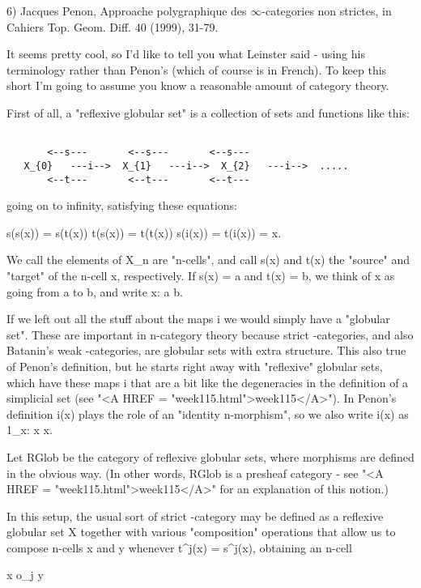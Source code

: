 6) Jacques Penon, Approache polygraphique des $\infty$-categories
non strictes, in Cahiers Top. Geom. Diff. 40 (1999), 31-79.

It seems pretty cool, so I'd like to tell you what Leinster said -
using his terminology rather than Penon's (which of course is in
French).  To keep this short I'm going to assume you know a 
reasonable amount of category theory.

First of all, a "reflexive globular set" is a collection of sets and
functions like this:


\begin{verbatim}

       <--s---       <--s---       <--s---
   X_{0}   ---i-->  X_{1}   ---i-->  X_{2}   ---i-->  .....
       <--t---       <--t---       <--t---
\end{verbatim}
    
going on to infinity, satisfying these equations:

s(s(x)) = s(t(x))
t(s(x)) = t(t(x)) 
s(i(x)) = t(i(x)) = x.

We call the elements of X_{n} are "n-cells", and call s(x) and t(x) the
"source" and "target" of the n-cell x, respectively.  If s(x) = a and
t(x) = b, we think of x as going from a to b, and write x: a \to  b.  

If we left out all the stuff about the maps i we would simply have a
"globular set".  These are important in n-category theory because
strict \omega -categories, and also Batanin's weak \omega -categories, are
globular sets with extra structure.   This also true of Penon's
definition, but he starts right away with "reflexive" globular sets,
which have these maps i that are a bit like the degeneracies in the
definition of a simplicial set (see "<A HREF = "week115.html">week115</A>").  In Penon's definition
i(x) plays the role of an "identity n-morphism", so we also write i(x)
as 1_{x}: x \to  x.

Let RGlob be the category of reflexive globular sets, where morphisms
are defined in the obvious way.  (In other words, RGlob is a presheaf
category - see "<A HREF = "week115.html">week115</A>" for an explanation of this notion.)

In this setup, the usual sort of strict \omega -category may be
defined as a reflexive globular set X together with various 
"composition" operations that allow us to compose n-cells x and y 
whenever t^j(x) = s^j(x), obtaining an n-cell 

x o_{j} y 

